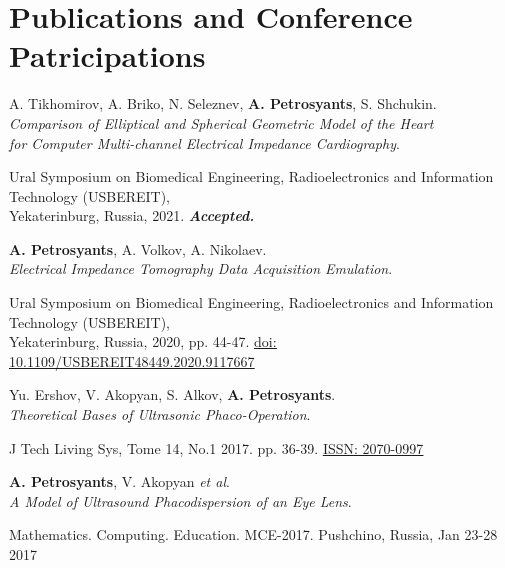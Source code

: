 \section{Publications and Conference Patricipations}
\resumeSubHeadingListStart

\resumeProjectHeading
  {A. Tikhomirov, A. Briko, N. Seleznev, \textbf{A. Petrosyants}, S. Shchukin.\\
  \textit{Comparison of Elliptical and Spherical Geometric
  Model of the Heart}\\
  \textit{for Computer Multi-channel Electrical Impedance Cardiography}.}{}
      \begin{itemize}[leftmargin=0in, label={}]
        \small{\item{
          {Ural Symposium on Biomedical Engineering, Radioelectronics and Information Technology (USBEREIT), \\ 
          Yekaterinburg, Russia, 2021.}
          {\textbf{\textit{Accepted.}}}
        }}
      \end{itemize}

\resumeProjectHeading
    {\textbf{A. Petrosyants}, A. Volkov, A. Nikolaev.\\
  \textit{Electrical Impedance Tomography Data Acquisition Emulation}.}{}
      \begin{itemize}[leftmargin=0in, label={}]
      \small{\item{
        {Ural Symposium on Biomedical Engineering, Radioelectronics and Information Technology (USBEREIT), \\ 
              Yekaterinburg, Russia, 2020, pp. 44-47.}
        {\href{https://ieeexplore.ieee.org/abstract/document/9117667/}{\underline{doi: 10.1109/USBEREIT48449.2020.9117667}}}
      }}
      \end{itemize}

  \resumeProjectHeading
      {Yu. Ershov, V. Akopyan, S. Alkov, \textbf{A. Petrosyants}.\\
    \textit{Theoretical Bases of Ultrasonic Phaco-Operation}.}{}
        \begin{itemize}[leftmargin=0in, label={}]
        \small{\item{ 
          {J Tech Living Sys, Tome 14, No.1 2017. pp. 36-39. \href{https://www.elibrary.ru/item.asp?id=29715174}{\underline{ISSN: 2070-0997}}}
            }}
      \end{itemize}

  \resumeProjectHeading
    {\textbf{A. Petrosyants}, V. Akopyan \textit{et al}.\\
  \textit{A Model of Ultrasound Phacodispersion of an Eye Lens}.}{}
      \begin{itemize}[leftmargin=0in, label={}]
     \small{\item{ 
              {Mathematics. Computing. Education. MCE-2017. Pushchino, Russia, Jan 23-28 2017}
      }}
      \end{itemize}

